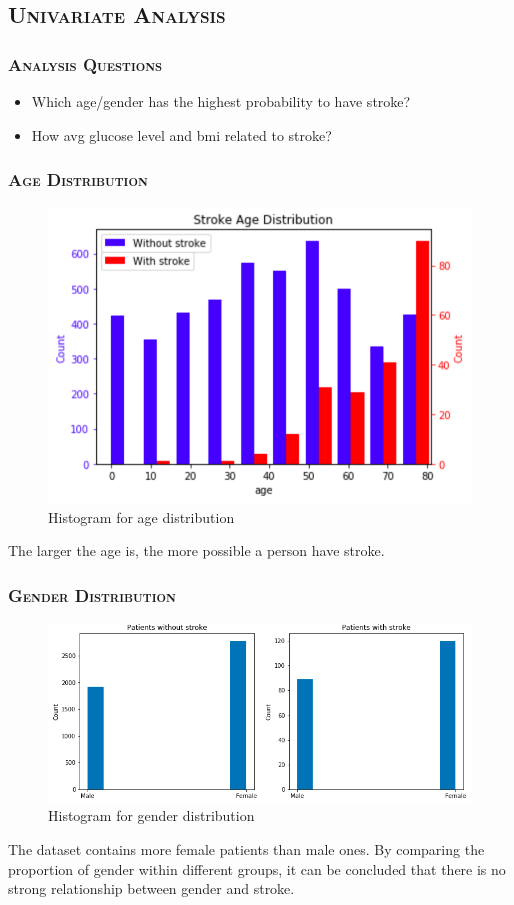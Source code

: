\documentclass[a4paper,12pt]{article}
\begin{document}
\newpage


\subsection{\textsc{Univariate Analysis}}
\subsubsection{\textsc{Analysis Questions}}
\begin{itemize}
\item Which age/gender has the highest probability to have stroke?
\item How avg glucose level and bmi related to stroke?
\end{itemize}
\subsubsection{\textsc{Age Distribution}}
\begin{figure}[h] 
    \centering
    \includegraphics[width=.7\textwidth]{uni_p6} 
    \caption{Histogram for age distribution} 
\end{figure}
The larger the age is, the more possible a person have stroke.
\subsubsection{\textsc{Gender Distribution}}
\begin{figure}[h] 
    \centering
    \includegraphics[width=.7\textwidth]{uni_p3} 
    \caption{Histogram for gender distribution} 
\end{figure}
The dataset contains more female patients than male ones. By comparing the proportion of gender within different groups, it can be concluded that there is no strong relationship between gender and stroke.
\end{document}
